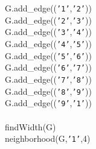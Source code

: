 {{\begin{tabbing}
\hspace{24pt}G.add\_edge(({\texttt{{'}1{'}}},{\texttt{{'}2{'}}}))\\
\hspace{24pt}G.add\_edge(({\texttt{{'}2{'}}},{\texttt{{'}3{'}}}))\\
\hspace{24pt}G.add\_edge(({\texttt{{'}3{'}}},{\texttt{{'}4{'}}}))\\
\hspace{24pt}G.add\_edge(({\texttt{{'}4{'}}},{\texttt{{'}5{'}}}))\\
\hspace{24pt}G.add\_edge(({\texttt{{'}5{'}}},{\texttt{{'}6{'}}}))\\
\hspace{24pt}G.add\_edge(({\texttt{{'}6{'}}},{\texttt{{'}7{'}}}))\\
\hspace{24pt}G.add\_edge(({\texttt{{'}7{'}}},{\texttt{{'}8{'}}}))\\
\hspace{24pt}G.add\_edge(({\texttt{{'}8{'}}},{\texttt{{'}9{'}}}))\\
\hspace{24pt}G.add\_edge(({\texttt{{'}9{'}}},{\texttt{{'}1{'}}}))\\
\\
\hspace{6pt}findWidth(G)\\
\hspace{6pt}neighborhood(G,{\texttt{{'}1{'}}},4)
\end{tabbing}}}
